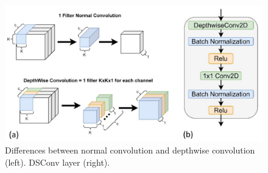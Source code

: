 \documentclass[conference]{IEEEtran}
\begin{document}
\begin{figure}[t]
\centering
\includegraphics[scale=0.5]{confronto3}
\caption{Differences between normal convolution and depthwise convolution (left). DSConv layer (right).}
\end{figure}
\end{document}

